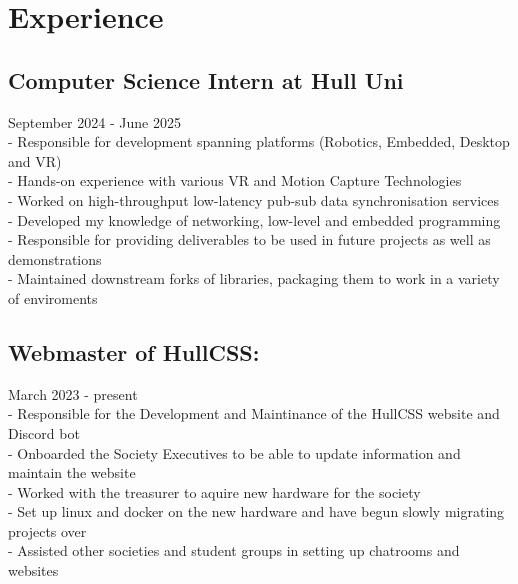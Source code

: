\section{Experience}

\subsection{Computer Science Intern at Hull Uni} September 2024 - June 2025 \\
-\: Responsible for development spanning platforms (Robotics, Embedded, Desktop and VR) \\
-\: Hands-on experience with various VR and Motion Capture Technologies \\
-\: Worked on high-throughput low-latency pub-sub data synchronisation services \\
-\: Developed my knowledge of networking, low-level and embedded programming \\
-\: Responsible for providing deliverables to be used in future projects as well as demonstrations \\
-\: Maintained downstream forks of libraries, packaging them to work in a variety of enviroments \\

\subsection{Webmaster of HullCSS:} March 2023 - present \\
-\: Responsible for the Development and Maintinance of the HullCSS website and Discord bot \\
-\: Onboarded the Society Executives to be able to update information and maintain the website \\
-\: Worked with the treasurer to aquire new hardware for the society \\
-\: Set up linux and docker on the new hardware and have begun slowly migrating projects over \\
-\: Assisted other societies and student groups in setting up chatrooms and websites \\

